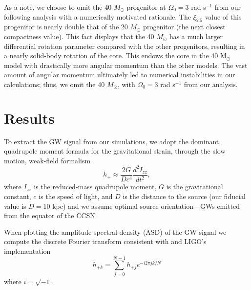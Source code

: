 \documentclass[twocolumn,times]{aastex62}  %
\newcommand{\Msun}{\ensuremath{\mathrm{M}_\odot}\xspace}
\begin{document}
As a note, we choose to omit the 40 $M_\odot$ progenitor at $\Omega_0 = 3$ rad s$^{-1}$ from our following analysis with a numerically motivated rationale.  The $\xi_{2.5}$ value of this progenitor is nearly double that of the 20 $M_\odot$ progenitor (the next closest compactness value).  This fact displays that the 40 $M_\odot$ has a much larger differential rotation parameter compared with the other progenitors, resulting in a nearly solid-body rotation of the core. This endows the core in the 40 \Msun model with drastically more angular momentum than the other models.  The vast amount of angular momentum ultimately led to numerical instabilities in our calculations; thus, we omit the 40 $M_\odot$, with $\Omega_0 = 3$ rad s$^{-1}$ from our analysis.  \\




%


\section{Results}
\label{sec:results}

To extract the GW signal from our simulations, we adopt the dominant, quadrupole moment formula for the gravitational strain, through the slow motion, weak-field formalism %
\citep[eg.][]{blanchet:1990,finn:1990}
\begin{equation}
    h_+ \approx \frac{2G}{Dc^4}
    \frac{d^2I_{zz}}{dt^2},
\label{eq:quad}
\end{equation}
where $I_{zz}$ is the reduced-mass quadrupole moment, $G$ is the gravitational constant, $c$ is the speed of light, and $D$ is the distance to the source (our fiducial value is $D=10$ kpc) and we assume optimal source orientation---GWs emitted from the equator of the CCSN.\\
\par When plotting the amplitude spectral density (ASD) of the GW signal we compute the discrete Fourier transform consistent with \citet{anderson:2004} and LIGO's implementation
\begin{equation}
\widetilde{h}_{+k} = \sum^{N-1}_{j=0} h_{+j} e^{-i2\pi jk/N}
\label{eq:dft}
\end{equation}
where $i=\sqrt{-1}$.
\end{document}
